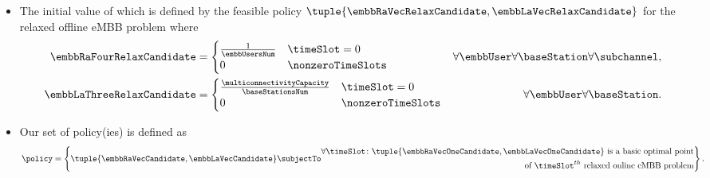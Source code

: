 \begin{frame}
  \begin{itemize}
    \item The initial value of which is defined by the feasible policy $\tuple{\embbRaVecRelaxCandidate, \embbLaVecRelaxCandidate}$ for the relaxed offline eMBB problem where\proofFootnote
      \begin{align}
        \embbRaFourRelaxCandidate &=
          \begin{cases}
            \frac{1}{\embbUsersNum} &\timeSlot = 0\\
            0 &\nonzeroTimeSlots
          \end{cases} &\forall\embbUser \forall\baseStation \forall\subchannel,\\
        \embbLaThreeRelaxCandidate &=
          \begin{cases}
            \frac{\multiconnectivityCapacity}{\baseStationsNum} &\timeSlot = 0\\
            0 &\nonzeroTimeSlots
          \end{cases} &\forall\embbUser \forall\baseStation.
      \end{align}
  \end{itemize}
\end{frame}

\begin{frame}
  \begin{itemize}
    \item Our set of policy(ies) is defined as
      \begin{equation}
        \policy = \left\{\tuple{\embbRaVecCandidate, \embbLaVecCandidate} \subjectTo
          \begin{aligned}
            \forall\timeSlot \colon \tuple{\embbRaVecOneCandidate, \embbLaVecOneCandidate} \text{ is a basic optimal point}\\
            \text{of $\timeSlot^{th}$ relaxed online eMBB problem}
          \end{aligned} \right\}.
      \end{equation}
  \end{itemize}
\end{frame}
